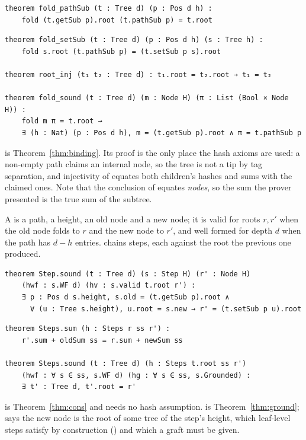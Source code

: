 \begin{lstlisting}
theorem fold_pathSub (t : Tree d) (p : Pos d h) :
    fold (t.getSub p).root (t.pathSub p) = t.root
\end{lstlisting}
\iffullversion\else
\begin{lstlisting}
theorem fold_setSub (t : Tree d) (p : Pos d h) (s : Tree h) :
    fold s.root (t.pathSub p) = (t.setSub p s).root

theorem root_inj (t₁ t₂ : Tree d) : t₁.root = t₂.root → t₁ = t₂

theorem fold_sound (t : Tree d) (m : Node H) (π : List (Bool × Node H)) :
    fold m π = t.root →
    ∃ (h : Nat) (p : Pos d h), m = (t.getSub p).root ∧ π = t.pathSub p
\end{lstlisting}

 is Theorem~\ref{thm:binding}. Its proof is the only
place the hash axioms are used: a non-empty path claims an internal node,
so the tree is not a tip by tag separation, and injectivity of
 equates both children's hashes and sums with the claimed
ones.
\fi
Note that the conclusion of  equates \emph{nodes}, so
the sum the prover presented is the true sum of the subtree.

A  is a path, a height, an old node and a new node; it is
valid for roots $r, r'$ when the old node folds to $r$ and the new node to
$r'$, and well formed for depth $d$ when the path has $d - h$ entries.
 chains steps, each against the root the previous one produced.

\begin{lstlisting}
theorem Step.sound (t : Tree d) (s : Step H) (r' : Node H)
    (hwf : s.WF d) (hv : s.valid t.root r') :
    ∃ p : Pos d s.height, s.old = (t.getSub p).root ∧
      ∀ (u : Tree s.height), u.root = s.new → r' = (t.setSub p u).root
\end{lstlisting}
\iffullversion\else
\begin{lstlisting}
theorem Steps.sum (h : Steps r ss r') :
    r'.sum + oldSum ss = r.sum + newSum ss

theorem Steps.sound (t : Tree d) (h : Steps t.root ss r')
    (hwf : ∀ s ∈ ss, s.WF d) (hg : ∀ s ∈ ss, s.Grounded) :
    ∃ t' : Tree d, t'.root = r'
\end{lstlisting}
\fi

 is Theorem~\ref{thm:cons} and needs no hash assumption.
 is Theorem~\ref{thm:ground};  says
the new node is the root of some tree of the step's height, which
leaf-level steps satisfy by construction () and
which a  graft must be given.


